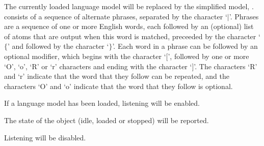   The currently loaded language model will be replaced by the simplified model, .
   consists of a sequence of alternate phrases, separated by the character `$\mid$'.
  Phrases are a sequence of one or more English words, each followed by an (optional) list of atoms that are
  output when this word is matched, preceeded by the character `$\{$' and followed by the character `$\}$'.
  Each word in a phrase can be followed by an optional modifier, which begins with the character `$[$',
  followed by one or more `O', `o', `R' or `r' characters and ending with the character `$]$'.
  The characters `R' and `r' indicate that the word that they follow can be repeated, and the characters
  `O' and `o' indicate that the word that they follow is optional.

  If a language model has been loaded, listening will be enabled.

  The state of the  object (idle, loaded or stopped) will be reported.

  Listening will be disabled.

  \objListCmdEnd

\objItemFile[]

